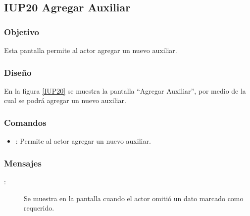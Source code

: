 \subsection{IUP20 Agregar Auxiliar}
 
\subsubsection{Objetivo}

    Esta pantalla permite al actor agregar un nuevo auxiliar.

\subsubsection{Diseño}

    En la figura \ref{IUP20} se muestra la pantalla ``Agregar Auxiliar'', por medio de la cual se podrá agregar un nuevo auxiliar. \\


\subsubsection{Comandos}
\begin{itemize}
    \item {}: Permite al actor agregar un nuevo auxiliar.
    
\end{itemize}

\subsubsection{Mensajes}

\begin{description}
    \item[:] Se muestra en la pantalla  cuando el actor omitió un dato marcado como requerido.
    
\end{description}
